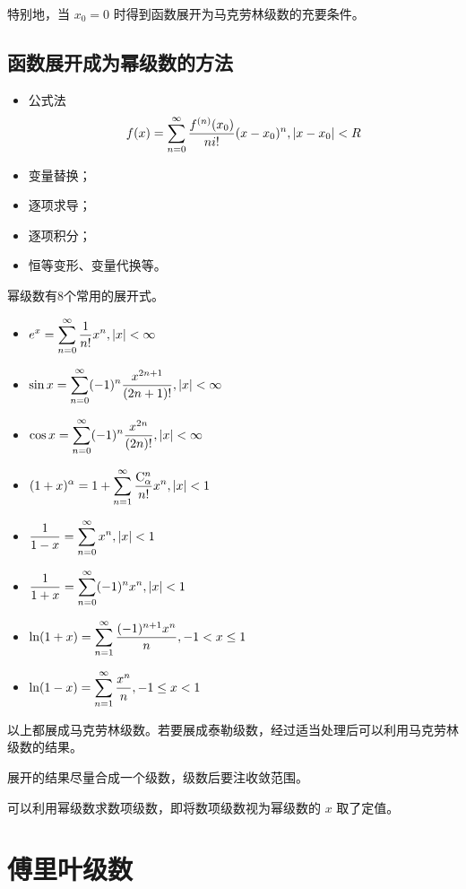 特别地，当 $ x_0 = 0 $ 时得到函数展开为马克劳林级数的充要条件。

\subsection{函数展开成为幂级数的方法}

\begin{itemize}
    \item 公式法 $$
     \displaystyle f(x) = \sum_{n=0}^\infty \dfrac{f^{(n)}(x_0)}{ni!}(x-x_0)^n,|x-x_0|<R 
    $$
    \item 变量替换；
    \item 逐项求导；
    \item 逐项积分；
    \item 恒等变形、变量代换等。
\end{itemize}

幂级数有8个常用的展开式。

\begin{itemize}
    \item $ \displaystyle e^x = \sum_{n=0}^{\infty}\dfrac{1}{n!}x^n, |x|<\infty $ 
    \item $ \displaystyle \sin x = \sum_{n=0}^{\infty}(-1)^n\dfrac{x^{2n+1}}{(2n+1)!},|x|<\infty $ 
    \item $ \displaystyle \cos x = \sum_{n=0}^{\infty}(-1)^n\dfrac{x^{2n}}{(2n)!},|x|<\infty $ 
    \item $ \displaystyle (1+x)^\alpha = 1 + \sum_{n=1}^{\infty}\dfrac{\mathrm{C}_\alpha^n}{n!}x^n, |x|<1 $ 
    \item $ \displaystyle \dfrac{1}{1-x} = \sum_{n=0}^{\infty}x^n, |x|<1 $ 
    \item $ \displaystyle \dfrac{1}{1+x} = \sum_{n=0}^{\infty}(-1)^nx^n, |x|<1 $ 
    \item $ \displaystyle \ln(1+x) = \sum_{n=1}^{\infty} \dfrac{(-1)^{n+1}x^n}{n}, -1<x\leq 1 $ 
    \item $ \displaystyle \ln(1-x) = \sum_{n=1}^{\infty} \dfrac{x^n}{n}, -1\leq x< 1 $ 
\end{itemize}

以上都展成马克劳林级数。若要展成泰勒级数，经过适当处理后可以利用马克劳林级数的结果。

展开的结果尽量合成一个级数，级数后要注收敛范围。

可以利用幂级数求数项级数，即将数项级数视为幂级数的 $ x $ 取了定值。

\section{傅里叶级数}

